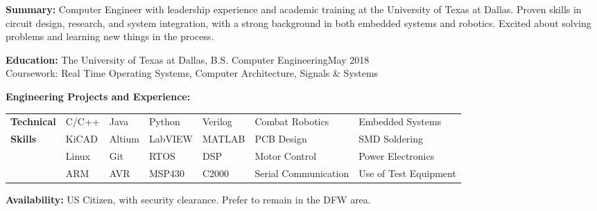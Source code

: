 \documentclass[11pt]{article}
\begin{document}
\thispagestyle{empty}

\textbf{Summary:} Computer Engineer with leadership experience and academic training at the University of Texas at Dallas. Proven skills in circuit design, research, and system integration, with a strong background in both embedded systems and robotics. Excited about solving problems and learning new things in the process.

\vspace{0.75em}
\textbf{Education:} The University of Texas at Dallas, B.S. Computer Engineering\hfill May 2018
\hfill
\\
Coursework: Real Time Operating Systems, Computer Architecture, Signals \& Systems

\vspace{0.75em}
\textbf{Engineering Projects and Experience:}\\

\vspace{0.5em}

\vspace{0.5em}

\vspace{0.5em}



\vspace{0.75em}
\begin{tabular}{@{}l l l l l l l}
    \textbf{Technical} & C/C++ & Java & Python & Verilog & Combat Robotics & Embedded Systems \\
    \textbf{Skills}    & KiCAD & Altium & LabVIEW & MATLAB & PCB Design & SMD Soldering \\
                       & Linux & Git & RTOS & DSP & Motor Control & Power Electronics \\
                       & ARM & AVR & MSP430 & C2000 & Serial Communication & Use of Test Equipment\\
\end{tabular}

\vspace{0.75em}
\textbf{Availability:} US Citizen, with security clearance. Prefer to remain in the DFW area.
\end{document}
